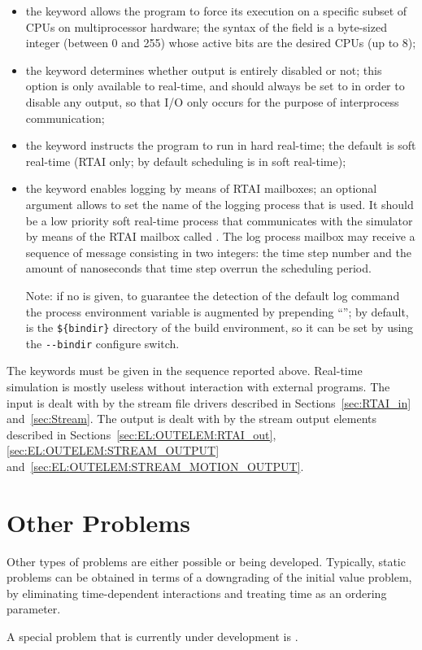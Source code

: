 \begin{itemize}
\item the keyword  allows the program to force its
execution on a specific subset of CPUs on multiprocessor hardware;
the syntax of the  field is a byte-sized integer 
(between 0 and 255) whose active bits are the desired CPUs (up to 8);

\item the keyword  determines whether output is entirely disabled
or not; this option is only available to  real-time,
and should always be set to  in order to disable any output,
so that I/O only occurs for the purpose of interprocess communication;

\item the keyword  instructs the program to run
in hard real-time; the default is soft real-time
(RTAI only; by default scheduling is in soft real-time);

\item the keyword  enables logging by means 
of RTAI mailboxes; an optional  argument allows 
to set the name of the logging process that is used.
It should be a low priority soft real-time process that communicates
with the simulator by means of the RTAI mailbox called .
The log process mailbox may receive a sequence of message consisting
in two integers: the time step number and the amount of nanoseconds
that time step overrun the scheduling period.

Note: if no  is given, to guarantee the detection 
of the default log command the process  environment variable 
is augmented by prepending ``''; by default,
 is the \verb;${bindir}; directory of the build environment,
so it can be set by using the \verb;--bindir; configure switch.
\end{itemize}
The keywords must be given in the sequence reported above.
Real-time simulation is mostly useless without interaction 
with external programs.
The input is dealt with by the stream file drivers described
in Sections~\ref{sec:RTAI_in} and~\ref{sec:Stream}.
The output is dealt with by the stream output
elements described in Sections~\ref{sec:EL:OUTELEM:RTAI_out},
\ref{sec:EL:OUTELEM:STREAM_OUTPUT}
and~\ref{sec:EL:OUTELEM:STREAM_MOTION_OUTPUT}.

\section{Other Problems}
Other types of problems are either possible or being developed.
Typically, static problems can be obtained in terms of a downgrading
of the initial value problem, by eliminating time-dependent
interactions and treating time as an ordering parameter.

A special problem that is currently under development
is .
